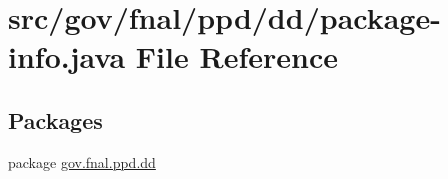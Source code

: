 \hypertarget{gov_2fnal_2ppd_2dd_2package-info_8java}{\section{src/gov/fnal/ppd/dd/package-\/info.java File Reference}
\label{gov_2fnal_2ppd_2dd_2package-info_8java}
}
\subsection*{Packages}
\begin{DoxyCompactItemize}
\item 
package \hyperlink{namespacegov_1_1fnal_1_1ppd_1_1dd}{gov.\-fnal.\-ppd.\-dd}
\end{DoxyCompactItemize}
